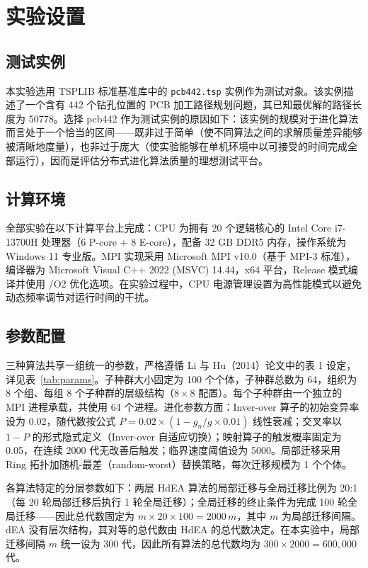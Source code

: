 \section{实验设置}

\subsection{测试实例}

本实验选用 TSPLIB 标准基准库中的 \texttt{pcb442.tsp} 实例作为测试对象。该实例描述了一个含有 442 个钻孔位置的 PCB 加工路径规划问题，其已知最优解的路径长度为 50778。选择 pcb442 作为测试实例的原因如下：该实例的规模对于进化算法而言处于一个恰当的区间——既非过于简单（使不同算法之间的求解质量差异能够被清晰地度量），也非过于庞大（使实验能够在单机环境中以可接受的时间完成全部运行），因而是评估分布式进化算法质量的理想测试平台。

\subsection{计算环境}

全部实验在以下计算平台上完成：CPU 为拥有 20 个逻辑核心的 Intel Core i7-13700H 处理器（6 P-core + 8 E-core），配备 32 GB DDR5 内存，操作系统为 Windows 11 专业版。MPI 实现采用 Microsoft MPI v10.0（基于 MPI-3 标准），编译器为 Microsoft Visual C++ 2022 (MSVC) 14.44，x64 平台，Release 模式编译并使用 /O2 优化选项。在实验过程中，CPU 电源管理设置为高性能模式以避免动态频率调节对运行时间的干扰。

\subsection{参数配置}

三种算法共享一组统一的参数，严格遵循 Li 与 Hu（2014）论文中的表 1 设定，详见表~\ref{tab:params}。子种群大小固定为 100 个个体，子种群总数为 64，组织为 8 个组、每组 8 个子种群的层级结构（$8\times8$ 配置）。每个子种群由一个独立的 MPI 进程承载，共使用 64 个进程。进化参数方面：Inver-over 算子的初始变异率设为 0.02，随代数按公式 $P = 0.02 \times (1 - g_n / g \times 0.01)$ 线性衰减；交叉率以 $1-P$ 的形式隐式定义（Inver-over 自适应切换）；映射算子的触发概率固定为 0.05，在连续 2000 代无改善后触发；临界速度阈值设为 5000。局部迁移采用 Ring 拓扑加随机-最差（random-worst）替换策略，每次迁移规模为 1 个个体。

各算法特定的分层参数如下：两层 HdEA 算法的局部迁移与全局迁移比例为 20:1（每 20 轮局部迁移后执行 1 轮全局迁移）；全局迁移的终止条件为完成 100 轮全局迁移——因此总代数固定为 $m \times 20 \times 100 = 2000\,m$，其中 $m$ 为局部迁移间隔。dEA 没有层次结构，其对等的总代数由 HdEA 的总代数决定。在本实验中，局部迁移间隔 $m$ 统一设为 300 代，因此所有算法的总代数均为 $300 \times 2000 = 600,000$ 代。

